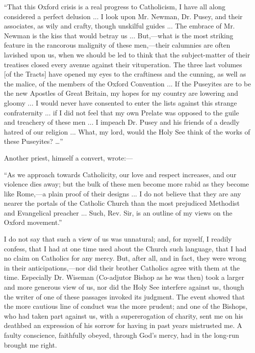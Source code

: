 ``That this Oxford crisis is a real progress to Catholicism, I
have all along considered a perfect delusion ... I look upon Mr. Newman,
Dr. Pusey, and their associates, as wily and crafty, though unskilful
guides ... The embrace of Mr. Newman is the kiss that would betray
us ... But,—what is the most striking feature in the rancorous
malignity of these men,—their calumnies are often lavished upon us,
when we should be led to think that the subject-matter of their
treatises closed every avenue against their vituperation. The three last
volumes [of the Tracts] have opened my eyes to the craftiness and the
cunning, as well as the malice, of the members of the Oxford Convention
... If the Puseyites are to be the new Apostles of Great Britain, my
hopes for my country are lowering and gloomy ... I would never have
consented to enter the lists against this strange confraternity ... if I
did not feel that my own Prelate was opposed to the guile and treachery
of these men ... I impeach Dr. Pusey and his friends of a deadly hatred
of our religion ... What, my lord, would the Holy See think of the works
of these Puseyites? …''

Another priest, himself a convert, wrote:—

``As we approach towards Catholicity, our love and respect
increases, and our violence dies away; but the bulk of these men become
more rabid as they become like Rome,—a plain proof of their designs
... I do not believe that they are any nearer the portals of the
Catholic Church than the most prejudiced Methodist and Evangelical
preacher ... Such, Rev. Sir, is an outline of my views on the Oxford
movement.''

I do not say that such a view of us was unnatural; and, for myself, I
readily confess, that I had at one time used about the Church such
language, that I had no claim on Catholics for any mercy. But, after
all, and in fact, they were wrong in their anticipations,—nor did
their brother Catholics agree with them at the time. Especially Dr.
Wiseman (Co-adjutor Bishop as he was then) took a larger and more
generous view of us, nor did the Holy See interfere against us, though
the writer of one of these passages invoked its judgment. The event
showed that the more cautious line of conduct was the more prudent; and
one of the Bishops, who had taken part against us, with a supererogation
of charity, sent me on his deathbed an expression of his sorrow for
having in past years mistrusted me. A faulty conscience, faithfully
obeyed, through God's mercy, had in the long-run brought me right.

